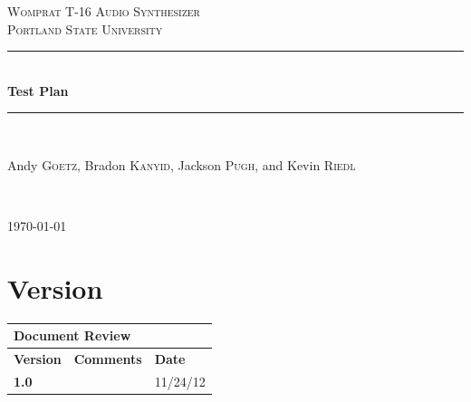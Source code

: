 \documentclass{article}
\newcommand{\HRule}{\rule{\linewidth}{0.5mm}}
\begin{document}
\newenvironment{frcseries}{\fontfamily{frc}\selectfont}{}
\newcommand{\textfrc}[1]{{\frcseries#1}}
\newcommand{\mathfrc}[1]{\text{\textfrc{#1}}}

\begin{titlepage}
 
\begin{center}
 
 
\textsc{\LARGE Womprat T-16 Audio Synthesizer}\\[1.5cm]
 
\textsc{\Large Portland State University}\\[0.5cm]
 
 
\HRule \\[0.4cm]
{ \huge \bfseries Test Plan}\\[0.4cm]
 
\HRule \\[1.5cm]
 
\begin{minipage}{0.4\textwidth}
\begin{center} \large
Andy \textsc{Goetz}, Bradon \textsc{Kanyid}, Jackson \textsc{Pugh}, and Kevin \textsc{Riedl}\\
\end{center}
\end{minipage}

 

 
 
\end{center}
\vfill
{ \textit{} }\\[4.0cm]
\begin{center}
{\large \today}

\end{center} 
\end{titlepage}

\newpage

\section{Version}
\begin{tabular}{|p{1in}|p{4in}|p{1in}|}
\hline
\multicolumn{3}{|l|}{\textbf{Document Review}} \\ 
\hline
\textbf{Version}& \textbf{Comments} & \textbf{Date} \\ 
\hline
\textbf{1.0} & & 11/24/12 \\
\hline
\end{tabular}
\end{document}
